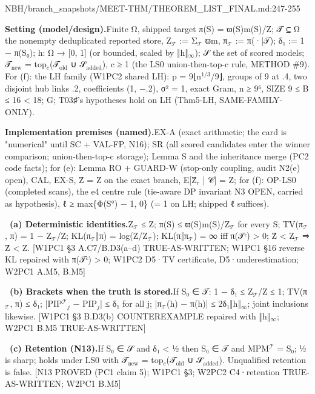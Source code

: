 \begin{stmt}{NBH/branch_snapshots/MEET-THM/THEOREM_LIST_FINAL.md:247-255}
\par\smallskip\noindent\textbf{Setting (model/design).}\enspace Finite Ω, shipped target π(S) = ϖ(S)m(S)/Z; 𝒯 ⊆ Ω the nonempty deduplicated reported store, Z$_{𝒯}$ := Σ$_{𝒯}$ ϖm, π$_{𝒯}$ := π(·|𝒯); δ₁ := 1 − π(S₀); h: Ω → [0, 1] (or bounded, scaled by ‖h‖$_{∞}$); 𝒮 the set of scored models; 𝒯$_{\mathrm{new}}$ = top$_{c}$(𝒯$_{\mathrm{old}}$ ∪ 𝒮$_{\mathrm{added}}$), c ≥ 1 (the LS0 union-then-top-c rule, METHOD \#9). For (f): the LH family (W1PC2 shared LH): p = 9⌊n$^{1/3}$/9⌋, groups of 9 at .4, two disjoint hub links .2, coefficients (1, −.2), σ² = 1, exact Gram, n ≥ 9⁶, SIZE 9 ≤ B ≤ 16 \textless{} 18; G; T03♯'s hypotheses hold on LH (Thm5-LH, SAME-FAMILY-ONLY).
\par\smallskip\noindent\textbf{Implementation premises (named).}\enspace EX-A (exact arithmetic; the card is "numerical" until SC + VAL-FP, N16); SR (all scored candidates enter the winner comparison; union-then-top-c storage); Lemma S and the inheritance merge (PC2 code facts); for (e): Lemma RO + GUARD-W (stop-only coupling, audit N2(e) open), CAL, EX-S, Ẑ = Z on the exact branch, E[Ẑ$_{r}$ | 𝒞] = Z; for (f): OP-LS0 (completed scans), the e4 centre rule (tie-aware DP invariant N3 OPEN, carried as hypothesis), ℓ ≥ max\{Φ(S°) − 1, 0\} (= 1 on LH; shipped ℓ suffices).
\par\smallskip\noindent\textbf{\ (a) Deterministic identities.}\enspace Z$_{𝒯}$ ≤ Z; π(S) ≤ ϖ(S)m(S)/Z$_{𝒯}$ for every S; TV(π$_{𝒯}$, π) = 1 − Z$_{𝒯}$/Z; KL(π$_{𝒯}$‖π) = log(Z/Z$_{𝒯}$); KL(π‖π$_{𝒯}$) = ∞ iff π(𝒯ᶜ) \textgreater{} 0; Ẑ \textless{} Z$_{𝒯}$ ⇒ Ẑ \textless{} Z. [W1PC1 §3 A.C7/B.D3(a–d) TRUE-AS-WRITTEN; W1PC1 §16 reverse KL repaired with π(𝒯ᶜ) \textgreater{} 0; W1PC2 D5·TV certificate, D5·underestimation; W2PC1 A.M5, B.M5]
\par\smallskip\noindent\textbf{\ (b) Brackets when the truth is stored.}\enspace If S₀ ∈ 𝒯: 1 − δ₁ ≤ Z$_{𝒯}$/Z ≤ 1; TV(π$_{𝒯}$, π) ≤ δ₁; |PIP$^{𝒯}$$_{j}$ − PIP$_{j}$| ≤ δ₁ for all j; |π$_{𝒯}$(h) − π(h)| ≤ 2δ₁‖h‖$_{∞}$; joint inclusions likewise. [W1PC1 §3 B.D3(b) COUNTEREXAMPLE repaired with ‖h‖$_{∞}$; W2PC1 B.M5 TRUE-AS-WRITTEN]
\par\smallskip\noindent\textbf{\ (c) Retention (N13).}\enspace If S₀ ∈ 𝒮 and δ₁ \textless{} ½ then S₀ ∈ 𝒯 and MPM$^{𝒯}$ = S₀; ½ is sharp; holds under LS0 with 𝒯$_{\mathrm{new}}$ = top$_{c}$(𝒯$_{\mathrm{old}}$ ∪ 𝒮$_{\mathrm{added}}$). Unqualified retention is false. [N13 PROVED (PC1 claim 5); W1PC1 §3; W2PC2 C4·retention TRUE-AS-WRITTEN; W2PC1 B.M5]
$$
\end{stmt}
